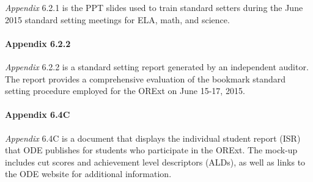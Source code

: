 \documentclass[]{article}
\let\oldparagraph\paragraph
\renewcommand{\paragraph}[1]{\oldparagraph{#1}\mbox{}}
\begin{document}
\emph{Appendix} 6.2.1 is the PPT slides used to train standard setters
during the June 2015 standard setting meetings for ELA, math, and
science.

\hypertarget{appendix-6.2.2}{%
\paragraph{Appendix 6.2.2}\label{appendix-6.2.2}}

\emph{Appendix} 6.2.2 is a standard setting report generated by an
independent auditor. The report provides a comprehensive evaluation of
the bookmark standard setting procedure employed for the ORExt on June
15-17, 2015.

\hypertarget{appendix-6.4c}{%
\paragraph{Appendix 6.4C}\label{appendix-6.4c}}

\emph{Appendix} 6.4C is a document that displays the individual student
report (ISR) that ODE publishes for students who participate in the
ORExt. The mock-up includes cut scores and achievement level descriptors
(ALDs), as well as links to the ODE website for additional information.
\end{document}
